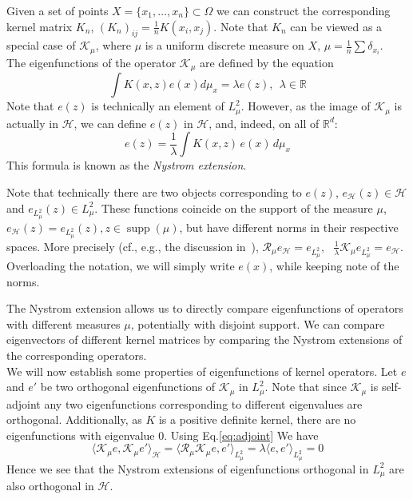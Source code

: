 \documentclass[final,12pt]{colt2018}
\renewcommand{\H}{\mathcal{H}}
\newcommand{\K}{\mathcal{K_\mu}}
\newcommand{\I}{\mathcal{R_{\mu}}}
\newcommand{\LL}{{L^2_\mu}}
\newcommand{\R}{\mathbb{R}}
\DeclareMathOperator{\supp}{supp}
\begin{document}
 Given a set of points $X = \{x_1,\ldots,x_n\} \subset \Omega$ we can construct the corresponding kernel matrix $K_n$, $(K_n)_{ij} = \frac{1}{n}K(x_i,x_j)$. Note that $K_n$ can be viewed as a special case of $\K$, where $\mu$ is a uniform discrete measure on $X$, $\mu = \frac{1}{n}\sum \delta_{x_i}$. \\ 
The eigenfunctions of the  operator $\K$ are defined by the equation 
$$
\int K(x,z)e(x) d\mu_x = \lambda e(z), ~~\lambda \in \R
$$
Note that $e(z)$ is technically an element of $\LL$. However, as the image of $\K$ is actually in $\H$, we  
can define $e(z)$ in $\H$, and, indeed, on all of $\R^d$:
$$
e(z) =\frac{1}{\lambda}\int K(x,z)\,e(x)\, d\mu_x
$$
This formula is known as the {\it Nystrom extension}. 

\begin{remark} Note that technically there are two objects corresponding to  $e(z)$, $e_\H(z) \in \H$ and $e_\LL (z) \in \LL$. These functions coincide on the support of the measure $\mu$, $e_\H(z) = e_\LL(z), z\in \supp(\mu)$,   but have different norms in their respective spaces. 
More precisely (cf., e.g., the discussion in~\cite{rosasco2010learning}),  %
$
\I e_\H = e_\LL, ~~~\frac{1}{\lambda}\K e_\LL = e_\H 
$.  Overloading the notation,  we will simply write $e(x)$, while keeping note of the norms. 
\end{remark}
The Nystrom extension allows us to directly compare eigenfunctions of operators with different measures $\mu$,  potentially with disjoint support. We can  compare  eigenvectors of different kernel matrices by comparing the Nystrom extensions of the corresponding operators.  \\
 We will now establish some properties of eigenfunctions of kernel operators. Let $e$ and $e'$ be two orthogonal eigenfunctions of $\K$ in $\LL$.  Note that since $\K$ is self-adjoint  any two eigenfunctions corresponding to different eigenvalues are orthogonal. Additionally, 
as $K$ is a positive definite kernel, there are no eigenfunctions			 with eigenvalue $0$. 
Using Eq.\ref{eq:adjoint} We have
\begin{equation}
\langle \K e, \K e' \rangle_\H =   \langle \I \K e,  e'\rangle_\LL = {\lambda} \langle e,  e'\rangle_\LL = 0
\end{equation}
Hence we see that the Nystrom extensions of eigenfunctions orthogonal in $\LL$ are also orthogonal in $\H$. 
\end{document}
